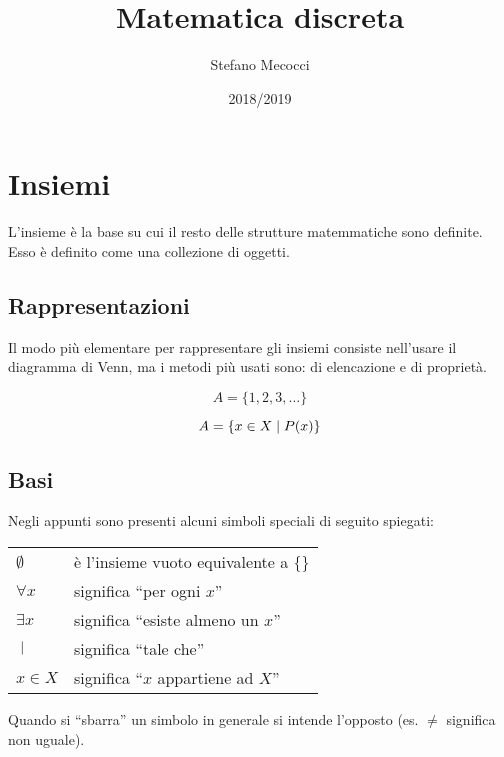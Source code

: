 \documentclass[12pt,a4paper]{article}
\title{Matematica discreta}
\author{Stefano Mecocci}
\date{2018/2019}
\newcommand{\Setsuchthat}{\;\ifnum\currentgrouptype=16 \middle\fi|\;}
\begin{document}
  \maketitle
  \thispagestyle{empty}
  {%
    \newpage
    \hypersetup{linkcolor=black}
    \tableofcontents
    \newpage
  }
  \section{Insiemi}
  L'insieme è la base su cui il resto delle strutture matemmatiche sono definite. Esso è definito come una collezione di oggetti.

  \subsection{Rappresentazioni}
  Il modo più elementare per rappresentare gli insiemi consiste nell'usare il diagramma di Venn, ma i metodi più usati sono: di elencazione e di proprietà.

  \begin{equation}
    A = \{1, 2, 3, \ldots\}
  \end{equation}

  \begin{equation}
    A = \{x \in X \Setsuchthat P(x)\}
  \end{equation}

  \subsection{Basi}
  Negli appunti sono presenti alcuni simboli speciali di seguito spiegati:
  \begin{center}
    \begin{tabular}{p{2cm}p{10cm}}
      $ \emptyset $ & è l'insieme vuoto equivalente a $ \{\} $\\
      $ \forall x $ & significa ``per ogni $x$''\\
      $ \exists x $ & significa ``esiste almeno un $x$''\\
      $ \Setsuchthat $ & significa ``tale che''\\
      $ x \in X $ & significa ``$x$ appartiene ad $X$''\\
    \end{tabular}
  \end{center}
  Quando si ``sbarra'' un simbolo in generale si intende l'opposto (es. $ \neq $ significa
  non uguale).
\end{document}
